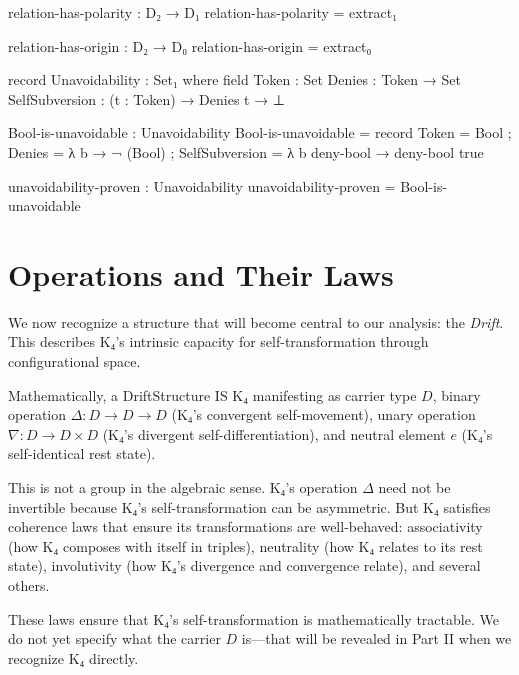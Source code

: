 \documentclass[11pt,a4paper]{book}
\begin{document}
\begin{code}
relation-has-polarity : D₂ → D₁
relation-has-polarity = extract₁

relation-has-origin : D₂ → D₀
relation-has-origin = extract₀
\end{code}

\begin{code}
record Unavoidability : Set₁ where
  field
    Token  : Set
    Denies : Token → Set
    SelfSubversion : (t : Token) → Denies t → ⊥

Bool-is-unavoidable : Unavoidability
Bool-is-unavoidable = record
  { Token = Bool
  ; Denies = λ b → ¬ (Bool)
  ; SelfSubversion = λ b deny-bool → 
      deny-bool true
  }

unavoidability-proven : Unavoidability
unavoidability-proven = Bool-is-unavoidable
\end{code}

\section{Operations and Their Laws}

We now recognize a structure that will become central to our analysis: the \emph{Drift}. This describes K₄'s intrinsic capacity for self-transformation through configurational space.

Mathematically, a DriftStructure IS K₄ manifesting as carrier type $D$, binary operation $\Delta : D \to D \to D$ (K₄'s convergent self-movement), unary operation $\nabla : D \to D \times D$ (K₄'s divergent self-differentiation), and neutral element $e$ (K₄'s self-identical rest state).

This is not a group in the algebraic sense. K₄'s operation $\Delta$ need not be invertible because K₄'s self-transformation can be asymmetric. But K₄ satisfies coherence laws that ensure its transformations are well-behaved: associativity (how K₄ composes with itself in triples), neutrality (how K₄ relates to its rest state), involutivity (how K₄'s divergence and convergence relate), and several others.

These laws ensure that K₄'s self-transformation is mathematically tractable. We do not yet specify what the carrier $D$ is—that will be revealed in Part II when we recognize K₄ directly.
\end{document}

